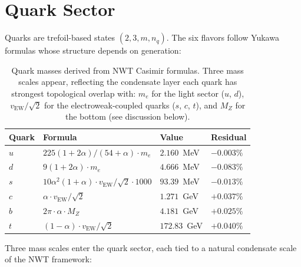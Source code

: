 \documentclass[11pt]{article}
\begin{document}
\section{Quark Sector}
\label{sec:quarks}

Quarks are trefoil-based states $(2, 3, m, n_q)$.  The six flavors
follow Yukawa formulas whose structure depends on generation:

\begin{table}[h]
\centering
\begin{tabular}{lll l}
\toprule
Quark & Formula & Value & Residual \\
\midrule
$u$   & $225(1+2\alpha)/(54+\alpha) \cdot m_e$         & $2.160$~MeV   & $-0.003\%$ \\
$d$   & $9(1+2\alpha) \cdot m_e$                        & $4.666$~MeV   & $-0.083\%$ \\
$s$   & $10\alpha^2(1+\alpha) \cdot v_\text{EW}/\sqrt{2}\cdot 1000$ & $93.39$~MeV  & $-0.013\%$ \\
$c$   & $\alpha \cdot v_\text{EW}/\sqrt{2}$             & $1.271$~GeV   & $+0.037\%$ \\
$b$   & $2\pi \cdot \alpha \cdot M_Z$                    & $4.181$~GeV   & $+0.025\%$ \\
$t$   & $(1-\alpha) \cdot v_\text{EW}/\sqrt{2}$         & $172.83$~GeV  & $+0.040\%$ \\
\bottomrule
\end{tabular}
\caption{Quark masses derived from NWT Casimir formulas.  Three
mass scales appear, reflecting the condensate layer each quark has
strongest topological overlap with: $m_e$ for the light sector
($u$, $d$), $v_\text{EW}/\sqrt{2}$ for the electroweak-coupled
quarks ($s$, $c$, $t$), and $M_Z$ for the bottom (see discussion
below).}
\label{tab:quarks}
\end{table}

Three mass scales enter the quark sector, each tied to a natural
condensate scale of the NWT framework:
\end{document}
